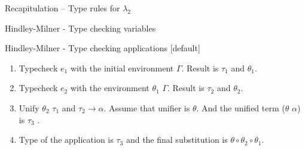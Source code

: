 \documentclass{beamer}
\begin{document}

\begin{frame}[fragile]{Recapitulation – Type rules for $\lambda_{2}$}
\end{frame}


\begin{frame}[fragile]{Hindley-Milner - Type checking variables}
\end{frame}


\begin{frame}[fragile]{Hindley-Milner - Type checking applications}
[default]
\begin{enumerate}[1]
    \item Typecheck $e_1$ with the initial environment $\Gamma$. Result is $\tau_1$ and $\theta_1$.
    \item Typecheck $e_2$ with the environment $\theta_1$ $\Gamma$. Result is $\tau_2$ and $\theta_2$.
    \item Unify $\theta_2$ $\tau_1$ and $\tau_2 \to \alpha$. Assume that unifier is $\theta$. And the unified
term ($\theta$ $\alpha$) is $\tau_3$ .
    \item Type of the application is $\tau_3$ and the final substitution is $\theta\circ\theta_2\circ\theta_1$.
\end{enumerate}
\end{frame}
\end{document}

